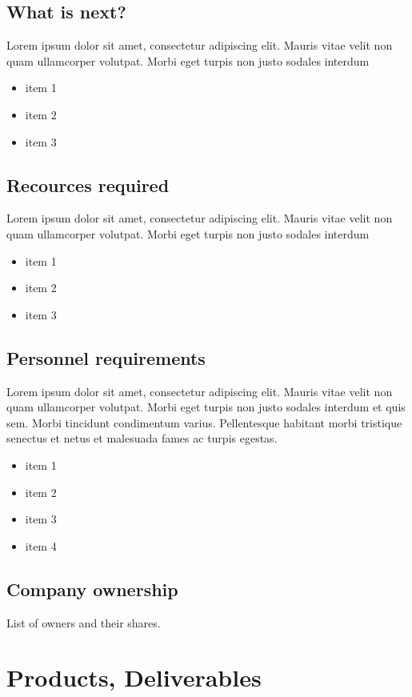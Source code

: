 \documentclass[11pt]{article}
\begin{document}
\subsection{What is next?}
Lorem ipsum dolor sit amet, consectetur adipiscing elit. Mauris vitae velit 
non quam ullamcorper volutpat. Morbi eget turpis non justo sodales interdum
\newline
\begin{itemize}
\item item 1
\item item 2
\item item 3
\end{itemize}
 
\subsection{Recources required}
Lorem ipsum dolor sit amet, consectetur adipiscing elit. Mauris vitae velit 
non quam ullamcorper volutpat. Morbi eget turpis non justo sodales interdum
\newline
\begin{itemize}
\item item 1
\item item 2
\item item 3
\end{itemize}

\subsection{Personnel requirements}
Lorem ipsum dolor sit amet, consectetur adipiscing elit. Mauris vitae velit 
non quam ullamcorper volutpat. Morbi eget turpis non justo sodales interdum 
et quis sem. Morbi tincidunt condimentum varius. Pellentesque habitant morbi 
tristique senectus et netus et malesuada fames ac turpis egestas.\newline
\begin{itemize}
\item item 1
\item item 2
\item item 3
\item item 4
\end{itemize}

\subsection{Company ownership}
List of owners and their shares.
\pagebreak


\section{Products, Deliverables}
\end{document}
